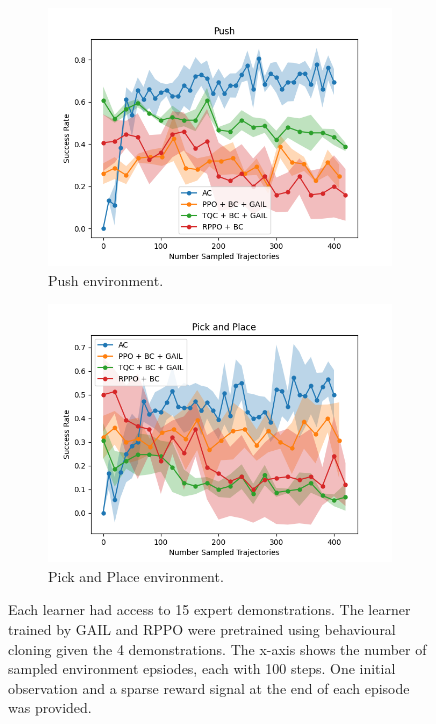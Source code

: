 \begin{figure}[htbp]
\begin{subfigure}[b]{0.45\textwidth}
      \includegraphics[width=\textwidth]{images/15_400/Push.png}
      \caption{Push environment.}
      \label{fig:plot3}
    \end{subfigure}
    \hfill
    \begin{subfigure}[b]{0.45\textwidth}
      \includegraphics[width=\textwidth]{images/15_400/Pick and Place.png}
      \caption{Pick and Place environment.}
      \label{fig:plot4}
    \end{subfigure}
    \caption{Each learner had access to 15 expert demonstrations. 
    The learner trained by GAIL and RPPO were pretrained using behavioural cloning given the 4 demonstrations. 
    The x-axis shows the number of sampled environment epsiodes, each with 100 steps. One initial observation and a sparse reward signal at the end of each episode was provided.}
    \label{fig:4}
\end{figure}

